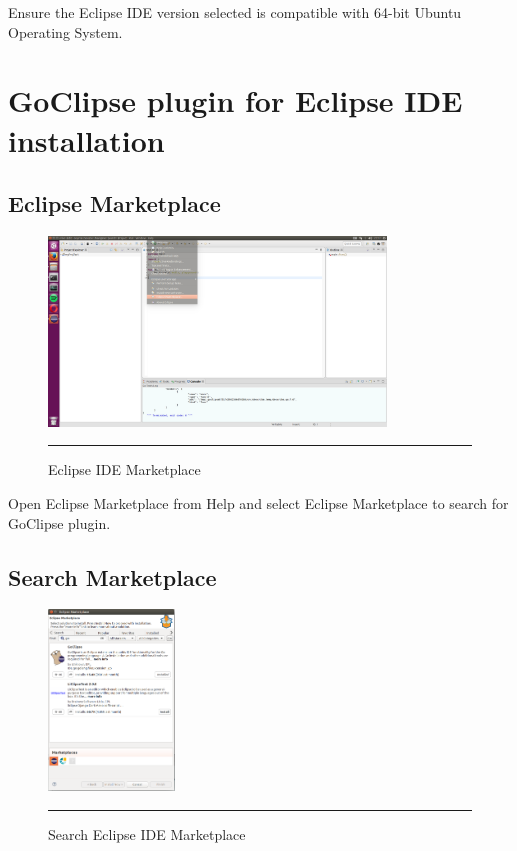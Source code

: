 Ensure the Eclipse IDE version selected is compatible with 64-bit Ubuntu Operating System.

\section{GoClipse plugin for Eclipse IDE installation}

\subsection{Eclipse Marketplace}

\begin{figure}[H]
	\centering
	\includegraphics[width=0.8\textwidth]{Figure/AppendixA/goclipse-installation/goclipse-marketplace-1.png}
	\rule{35em}{0.5pt}
	\caption[Eclipse IDE Marketplace]{Eclipse IDE Marketplace}
\end{figure}

Open Eclipse Marketplace from Help and select Eclipse Marketplace to search for GoClipse plugin.

\subsection{Search Marketplace}

\begin{figure}[H]
	\centering
	\includegraphics[width=0.3\textwidth]{Figure/AppendixA/goclipse-installation/goclipse-search-marketplace-2.png}
	\rule{35em}{0.5pt}
	\caption[Search Eclipse IDE Marketplace]{Search Eclipse IDE Marketplace}
\end{figure}


